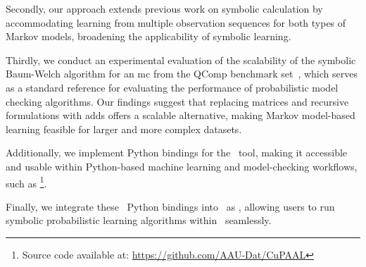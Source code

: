 Secondly, our approach extends previous work on symbolic calculation by accommodating learning from multiple observation sequences for both types of Markov models, broadening the applicability of symbolic learning.

Thirdly, we conduct an experimental evaluation of the scalability of the symbolic Baum-Welch algorithm for an \gls{mc} from the QComp benchmark set~\cite{HartmannsKPQR19}, which serves as a standard reference for evaluating the performance of probabilistic model checking algorithms.
Our findings suggest that replacing matrices and recursive formulations with \glspl{add} offers a scalable alternative, making Markov model-based learning feasible for larger and more complex datasets.

Additionally, we implement Python bindings for the \Cupaal\ tool, making it accessible and usable within Python-based machine learning and model-checking workflows, such as \Jajapy\footnote{Source code available at: \url{https://github.com/AAU-Dat/CuPAAL}}.

Finally, we integrate these \Cupaal\ Python bindings into \Jajapy\ as \JajapyTwo, allowing users to run symbolic probabilistic learning algorithms within \Jajapy\ seamlessly.
